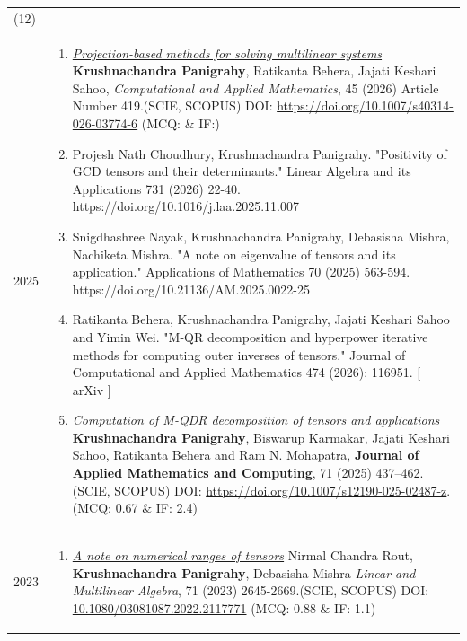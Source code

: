 \documentclass[a4paper,12pt]{article}
\begin{document}
\begin{longtable}{lp{15cm}}
\multicolumn{2}{l}{\color{pub}{\textsc{Published}}(12)}\\[0.2cm]
\textsc{2025}&
\vspace{-0.3cm}
\begin{enumerate}
\item \href{https://doi.org/10.1007/s40314-026-03774-6}{\it Projection-based methods for solving multilinear systems}\newline
{\footnotesize
{\bf Krushnachandra Panigrahy}, Ratikanta Behera, Jajati Keshari Sahoo,\newline
{\it Computational and Applied Mathematics}, 45 (2026) Article Number 419.\hfill{(SCIE, SCOPUS)} \newline
DOI: \href{https://doi.org/10.1007/s40314-026-03774-6}{https://doi.org/10.1007/s40314-026-03774-6} \hfill(MCQ:  $\&$ IF:)
}
\item Projesh Nath Choudhury, Krushnachandra Panigrahy. "Positivity of GCD tensors and their determinants." Linear Algebra and its Applications 731 (2026) 22-40. https://doi.org/10.1016/j.laa.2025.11.007
\item Snigdhashree Nayak, Krushnachandra Panigrahy, Debasisha Mishra, Nachiketa Mishra. "A note on eigenvalue of tensors and its application." Applications of Mathematics 70 (2025) 563-594. https://doi.org/10.21136/AM.2025.0022-25
\item Ratikanta Behera, Krushnachandra Panigrahy, Jajati Keshari Sahoo and Yimin Wei. "M-QR decomposition and hyperpower iterative methods for computing outer inverses of tensors." Journal of Computational and Applied Mathematics 474 (2026): 116951. [ arXiv ]
\item \href{https://doi.org/10.1007/s12190-025-02487-z}{\it Computation of M-QDR decomposition of tensors and applications}\newline
{\footnotesize
{\bf Krushnachandra Panigrahy}, Biswarup Karmakar, 
Jajati Keshari Sahoo, Ratikanta Behera and Ram N. Mohapatra, \newline
{\bf Journal of Applied Mathematics and Computing}, 71 (2025) 437–462. \hfill{(SCIE, SCOPUS)}\newline
\vspace{-0.5cm}
DOI: \href{https://doi.org/10.1007/s12190-025-02487-z}{https://doi.org/10.1007/s12190-025-02487-z}. \hfill(MCQ: 0.67 $\&$ IF: 2.4)
}
\end{enumerate}\\[-0.5cm]
\textsc{2023}&
\vspace{-0.5cm}
\begin{enumerate}[resume]
\item \href{https://doi.org/10.1080/03081087.2022.2117771}{\it A note on numerical ranges of tensors}\newline
{\footnotesize
Nirmal Chandra Rout, {\bf Krushnachandra Panigrahy}, Debasisha Mishra \newline
{\it Linear and Multilinear Algebra}, 71 (2023) 2645-2669.\hfill{(SCIE, SCOPUS)} \newline
DOI: \href{https://doi.org/10.1080/03081087.2022.2117771}{10.1080/03081087.2022.2117771} \hfill(MCQ: 0.88 $\&$ IF: 1.1)
}


\end{enumerate}
\end{longtable}
\end{document}
